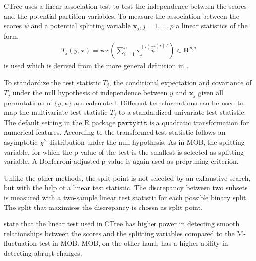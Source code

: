 CTree uses a linear association test to test the independence between the scores and the potential partition variables.
To measure the association between the scores $\psi$ and a potential splitting variable $\textbf{x}_{j}, j = 1,...,p$ a linear statistics of the form 
\begin{align}
    T_{j}(y,\textbf{x}) = vec\left(\sum_{i=1}^n \textbf{x}_j^{(i)}\hat{\psi}^{(i)T}\right) \in \mathbf{R}^{p_{j} q}
\end{align}
is used which is derived from the more general definition in \citep{Hothorn.2006}.

To standardize the test statistic $T_{j}$, the conditional expectation and covariance of $T_{j}$ under the null hypothesis of independence between $y$ and $\textbf{x}_j$ given all permutations of $\{y,\textbf{x}\}$ are calculated.
Different transformations can be used to map the multivariate test statistic $T_{j}$ to a standardized univariate test statistic. The default setting in the R package $\mathtt{partykit}$  \citep{Hothorn.2015b} is a quadratic transformation for numerical features. According to  \citep{Hothorn.2006} the transformed test statistic follows an asymptotic $\chi^2$ distribution under the null hypothesis.
As in MOB, the splitting variable, for which the p-value of the test is the smallest is selected as splitting variable. A Bonferroni-adjusted p-value is again used as prepruning criterion.



Unlike the other methods, the split point is not selected by an exhaustive search, but with the help of a linear test statistic. The discrepancy between two subsets is measured with a two-sample linear test statistic for each possible binary split. The split that maximises the discrepancy is chosen as split point. \citep{Hothorn.2006}

\citet{Schlosser.2019} state that the linear test used in CTree has higher power in detecting smooth relationships between the scores and the splitting variables compared to the M-fluctuation test in MOB. MOB, on the other hand, has a higher ability in detecting abrupt changes.


